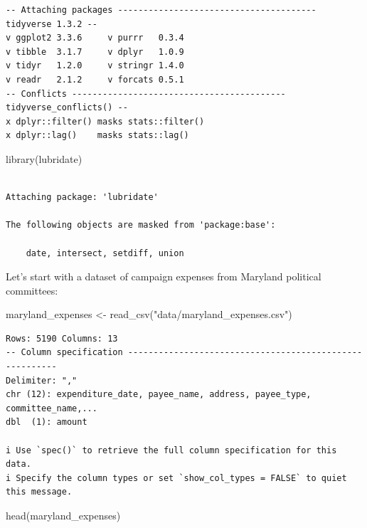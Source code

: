 \documentclass[
  letterpaper,
  DIV=11,
  numbers=noendperiod]{scrreprt}
\newenvironment{Shaded}{\begin{snugshade}}{\end{snugshade}}
\newcommand{\FunctionTok}[1]{\textcolor[rgb]{0.28,0.35,0.67}{#1}}
\newcommand{\NormalTok}[1]{\textcolor[rgb]{0.00,0.23,0.31}{#1}}
\newcommand{\OtherTok}[1]{\textcolor[rgb]{0.00,0.23,0.31}{#1}}
\newcommand{\StringTok}[1]{\textcolor[rgb]{0.13,0.47,0.30}{#1}}
\begin{document}
\begin{verbatim}
-- Attaching packages --------------------------------------- tidyverse 1.3.2 --
v ggplot2 3.3.6     v purrr   0.3.4
v tibble  3.1.7     v dplyr   1.0.9
v tidyr   1.2.0     v stringr 1.4.0
v readr   2.1.2     v forcats 0.5.1
-- Conflicts ------------------------------------------ tidyverse_conflicts() --
x dplyr::filter() masks stats::filter()
x dplyr::lag()    masks stats::lag()
\end{verbatim}

\begin{Shaded}
\begin{Highlighting}[]
\FunctionTok{library}\NormalTok{(lubridate)}
\end{Highlighting}
\end{Shaded}

\begin{verbatim}

Attaching package: 'lubridate'

The following objects are masked from 'package:base':

    date, intersect, setdiff, union
\end{verbatim}

Let's start with a dataset of campaign expenses from Maryland political
committees:

\begin{Shaded}
\begin{Highlighting}[]
\NormalTok{maryland\_expenses }\OtherTok{\textless{}{-}} \FunctionTok{read\_csv}\NormalTok{(}\StringTok{"data/maryland\_expenses.csv"}\NormalTok{)}
\end{Highlighting}
\end{Shaded}

\begin{verbatim}
Rows: 5190 Columns: 13
-- Column specification --------------------------------------------------------
Delimiter: ","
chr (12): expenditure_date, payee_name, address, payee_type, committee_name,...
dbl  (1): amount

i Use `spec()` to retrieve the full column specification for this data.
i Specify the column types or set `show_col_types = FALSE` to quiet this message.
\end{verbatim}

\begin{Shaded}
\begin{Highlighting}[]
\FunctionTok{head}\NormalTok{(maryland\_expenses)}
\end{Highlighting}
\end{Shaded}
\end{document}
